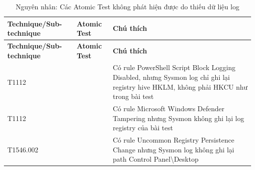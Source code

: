 \begingroup
\small
\renewcommand{\arraystretch}{1.12}
\begin{longtable}{|>{\raggedright\arraybackslash}p{3.2cm}|>{\centering\arraybackslash}p{2.0cm}|>{\raggedright\arraybackslash}p{9.1cm}|}
\caption{Nguyên nhân: Các Atomic Test không phát hiện được do thiếu dữ liệu log}\label{tab:log-khong-du-reasons}\\
\hline
\textbf{Technique/Sub-technique} & \textbf{Atomic Test} & \textbf{Chú thích} \\
\hline
\endfirsthead
\hline
\textbf{Technique/Sub-technique} & \textbf{Atomic Test} & \textbf{Chú thích} \\
\hline
\endhead
\hline
\endfoot
\hline
\endlastfoot
T1112 & 33 & Có rule PowerShell Script Block Logging Disabled, nhưng Sysmon log chỉ ghi lại registry hive HKLM, không phải HKCU như trong bài test \\ \hline
T1112 & 43 & Có rule Microsoft Windows Defender Tampering nhưng Sysmon không ghi lại log registry của bài test \\ \hline
T1546.002 & 1 & Có rule Uncommon Registry Persistence Change nhưng Sysmon log không ghi lại path Control Panel\textbackslash{}Desktop \\ \hline
\end{longtable}
\endgroup
